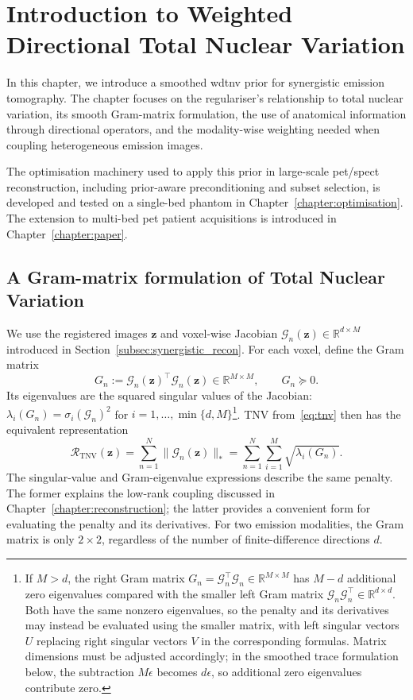 \chapter{Introduction to Weighted Directional Total Nuclear Variation}
\label{chapter:wdtnv}
In this chapter, we introduce a smoothed \acrfull{wdtnv} prior for synergistic emission tomography. The chapter focuses on the regulariser's relationship to total nuclear variation, its smooth Gram-matrix formulation, the use of anatomical information through directional operators, and the modality-wise weighting needed when coupling heterogeneous emission images.

The optimisation machinery used to apply this prior in large-scale \gls{pet}/\gls{spect} reconstruction, including prior-aware preconditioning and subset selection, is developed and tested on a single-bed phantom in Chapter~\ref{chapter:optimisation}. The extension to multi-bed \gls{pet} patient acquisitions is introduced in Chapter~\ref{chapter:paper}.

\section{A Gram-matrix formulation of Total Nuclear Variation}
\label{sec:tv_to_tnv}
We use the registered images $\bm{z}$ and voxel-wise Jacobian $\mathcal{G}_n(\bm{z})\in\mathbb{R}^{d\times M}$ introduced in Section~\ref{subsec:synergistic_recon}. For each voxel, define the Gram matrix
\begin{equation}
    G_n := \mathcal{G}_n(\bm{z})^\top\mathcal{G}_n(\bm{z})
    \in\mathbb{R}^{M\times M},
    \qquad G_n\succeq0.
    \label{eq:tnv_gram}
\end{equation}
Its eigenvalues are the squared singular values of the Jacobian: $\lambda_i(G_n)=\sigma_i(\mathcal{G}_n)^2$ for $i=1,\ldots,\min\{d,M\}$\footnote{If \(M>d\), the right Gram matrix \(G_n=\mathcal G_n^\top\mathcal G_n\in\mathbb R^{M\times M}\) has \(M-d\) additional zero eigenvalues compared with the smaller left Gram matrix \(\mathcal G_n\mathcal G_n^\top\in\mathbb R^{d\times d}\). Both have the same nonzero eigenvalues, so the penalty and its derivatives may instead be evaluated using the smaller matrix, with left singular vectors \(U\) replacing right singular vectors \(V\) in the corresponding formulas. Matrix dimensions must be adjusted accordingly; in the smoothed trace formulation below, the subtraction \(M\epsilon\) becomes \(d\epsilon\), so additional zero eigenvalues contribute zero.}. TNV from~\eqref{eq:tnv} then has the equivalent representation
\begin{equation}
    \mathcal{R}_{\mathrm{TNV}}(\bm{z})
    =\sum_{n=1}^N\|\mathcal{G}_n(\bm{z})\|_*
    =\sum_{n=1}^N\sum_{i=1}^{M}\sqrt{\lambda_i(G_n)}.
    \label{eq:tnv_gram_spectral}
\end{equation}
The singular-value and Gram-eigenvalue expressions describe the same penalty. The former explains the low-rank coupling discussed in Chapter~\ref{chapter:reconstruction}; the latter provides a convenient form for evaluating the penalty and its derivatives. For two emission modalities, the Gram matrix is only $2\times2$, regardless of the number of finite-difference directions $d$.

